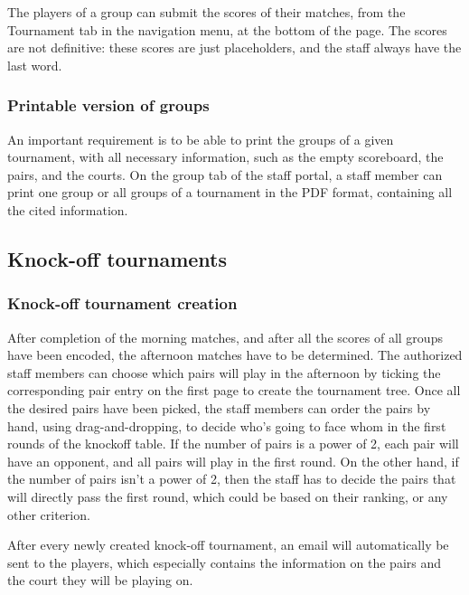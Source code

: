 The players of a group can submit the scores of their matches, from the
Tournament tab in the navigation menu, at the bottom of the page.
The scores are not definitive: these scores are just placeholders, and
the staff always have the last word.

\subsubsection{Printable version of groups}
\label{subs:Printable version of groups}


An important requirement is to be able to print the groups of a given
tournament, with all necessary information, such as the empty scoreboard, the
pairs, and the courts. On the group tab of the staff portal, a staff member can
print one group or all groups of a tournament in the PDF format, containing
all the cited information.

\subsection{Knock-off tournaments}
\label{sub:Knock-off tournaments}

\subsubsection{Knock-off tournament creation}
\label{subs:Knock-off tournament creation}


After completion of the morning matches, and after all the scores of all groups
have been encoded, the afternoon matches have to be determined.
The authorized staff members can choose which pairs will play
in the afternoon by ticking the corresponding pair entry on the first page
to create the tournament tree. Once all the desired pairs have been picked,
the staff members can order the pairs by hand, using drag-and-dropping,
to decide who's going to face whom in the first rounds of the knockoff table.
If the number of pairs is a power of 2, each pair will have an opponent, and
all pairs will play in the first round. On the other hand, if the number of
pairs isn't a power of 2, then the staff has to decide the pairs that will
directly pass the first round, which could be based on their ranking, or any
other criterion. \newline

After every newly created knock-off tournament, an email will automatically be
sent to the players, which especially contains the information on the pairs and
the court they will be playing on.

